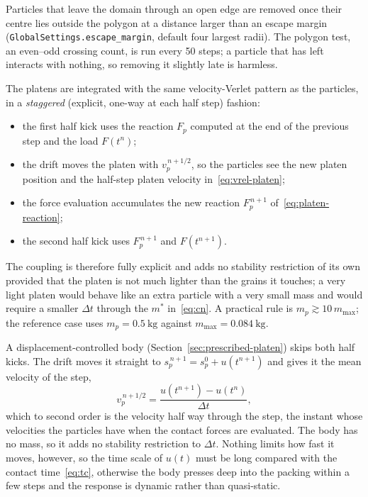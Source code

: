 Particles that leave the domain through an open edge are removed once their
centre lies outside the polygon at a distance larger than an escape margin
(\texttt{GlobalSettings.escape\_margin}, default four largest radii).  The
polygon test, an even--odd crossing count, is run every 50 steps; a particle
that has left interacts with nothing, so removing it slightly late is harmless.

The platens are integrated with the same velocity-Verlet pattern as the
particles, in a \emph{staggered} (explicit, one-way at each half step) fashion:
\begin{itemize}[leftmargin=1.6em]
  \item the first half kick uses the reaction $F_{p}$ computed at the end of the
        previous step and the load $F(t^{n})$;
  \item the drift moves the platen with $v_{p}^{\,n+1/2}$, so the particles see
        the new platen position and the half-step platen velocity
        in~\eqref{eq:vrel-platen};
  \item the force evaluation accumulates the new reaction $F_{p}^{\,n+1}$
        of~\eqref{eq:platen-reaction};
  \item the second half kick uses $F_{p}^{\,n+1}$ and $F(t^{n+1})$.
\end{itemize}
The coupling is therefore fully explicit and adds no stability restriction of
its own provided that the platen is not much lighter than the grains it
touches; a very light platen would behave like an extra particle with a very
small mass and would require a smaller $\Delta t$ through the $m^{*}$
in~\eqref{eq:cn}.  A practical rule is $m_{p}\gtrsim 10\,m_{\max}$; the
reference case uses $m_{p}=\qty{0.5}{\kilogram}$ against
$m_{\max}=\qty{0.084}{\kilogram}$.

A displacement-controlled body (Section~\ref{sec:prescribed-platen}) skips both half kicks.
The drift moves it straight to $s_{p}^{\,n+1}=s_{p}^{0}+u(t^{n+1})$ and gives it the mean velocity of the step,
\begin{equation}
  v_{p}^{\,n+1/2} = \frac{u(t^{n+1})-u(t^{n})}{\Delta t},
  \label{eq:prescribed-velocity}
\end{equation}
which to second order is the velocity half way through the step, the instant whose velocities the particles have when the contact forces are evaluated.
The body has no mass, so it adds no stability restriction to $\Delta t$.
Nothing limits how fast it moves, however, so the time scale of $u(t)$ must be long compared with the contact time~\eqref{eq:tc}, otherwise the body presses deep into the packing within a few steps and the response is dynamic rather than quasi-static.

